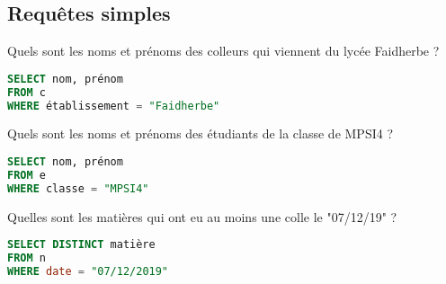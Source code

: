 \subsection{Requêtes simples} 
\begin{Exercise}
Quels sont les noms et prénoms des colleurs qui viennent du lycée Faidherbe ?
\end{Exercise}
\begin{Answer}
\begin{lstlisting}[language=SQL]
SELECT nom, prénom
FROM c
WHERE établissement = "Faidherbe"
\end{lstlisting}
\end{Answer}
\begin{Exercise}
Quels sont les noms et prénoms des étudiants de la classe de MPSI4 ?
\end{Exercise}
\begin{Answer}
\begin{lstlisting}[language=SQL]
SELECT nom, prénom
FROM e
WHERE classe = "MPSI4"
\end{lstlisting}
\end{Answer}
\begin{Exercise}
Quelles sont les matières qui ont eu au moins une colle le "07/12/19" ?
\end{Exercise}
\begin{Answer}
\begin{lstlisting}[language=SQL]
SELECT DISTINCT matière
FROM n
WHERE date = "07/12/2019"
\end{lstlisting}
\end{Answer}

